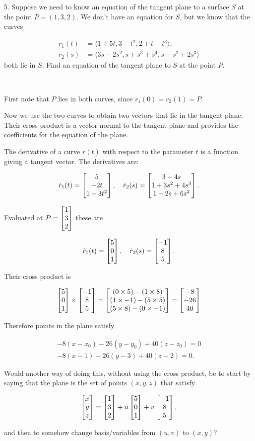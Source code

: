 \documentclass[12pt]{article}
\begin{document}
5. Suppose we need to know an equation of the tangent plane to a surface $S$ at
the point $P = (1, 3, 2)$. We don't have an equation for $S$, but we know that the
curves

\begin{align*}
r_1(t) &= \langle 1 + 5t,    3 - t^2,       2 + t - t^3    \rangle, \\
r_2(s) &= \langle 3s - 2s^2, s + s^3 + s^4, s - s^2 + 2s^3 \rangle
\end{align*}
both lie in $S$. Find an equation of the tangent plane to $S$ at the point $P$.


~\\\begin{mdframed}
First note that $P$ lies in both curves, since $r_1(0) = r_2(1) = P$.

Now we use the two curves to obtain two vectors that lie in the tangent
plane. Their cross product is a vector normal to the tangent plane and provides
the coefficients for the equation of the plane.

The derivative of a curve $r(t)$ with respect to the parameter $t$ is a
function giving a tangent vector. The derivatives are:

\begin{align*}
  \dot r_1(t) = \begin{bmatrix}5\\-2t\\1 - 3t^2\end{bmatrix}, ~~~
  \dot r_2(s) = \begin{bmatrix}3 - 4s\\1 + 3s^2 + 4s^3\\1 - 2s + 6s^2\end{bmatrix}.
\end{align*}

Evaluated at $P = \begin{bmatrix}1\\3\\2\end{bmatrix}$ these are

\begin{align*}
  \dot r_1(t) = \begin{bmatrix}5\\0\\1\end{bmatrix}, ~~~
  \dot r_2(s) = \begin{bmatrix}-1\\8\\5\end{bmatrix}.
\end{align*}

Their cross product is

\begin{align*}
  \begin{bmatrix}5\\0\\1\end{bmatrix} \times \begin{bmatrix}-1\\8\\5\end{bmatrix} =
  \begin{bmatrix}(0 \times 5) - (1 \times 8)\\(1 \times -1) - (5 \times 5)\\(5 \times 8) - (0 \times -1)\end{bmatrix} =
  \begin{bmatrix}-8\\-26\\40\end{bmatrix}
\end{align*}


Therefore points in the plane satisfy

\begin{align*}
  -8(x - x_0) - 26(y - y_0) + 40(z - z_0) = 0 \\
  -8(x - 1)   - 26(y - 3)   + 40(z - 2) = 0.
\end{align*}

Would another way of doing this, without using the cross product, be to start
by saying that the plane is the set of points $(x, y, z)$ that satisfy

\begin{align*}
  \begin{bmatrix}x\\y\\z\end{bmatrix} = \begin{bmatrix}1\\3\\2\end{bmatrix} + u\begin{bmatrix}5\\0\\1\end{bmatrix} + v \begin{bmatrix}-1\\8\\5\end{bmatrix},
\end{align*}

and then to somehow change basis/variables from $(u, v)$ to $(x, y)$?

\end{mdframed}
\end{document}

